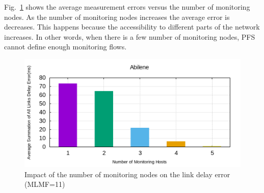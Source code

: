 \documentclass[10pt, journal, letterpaper]{IEEEtran}
\begin{document}
Fig.~\ref{fig:eval_Abilene_summation_of_all_links_delay_error_ms_bar_chart} shows the average measurement errors versus the number of monitoring nodes. As the number of monitoring nodes increases the average error is decreases. This happens because the accessibility to different parts of the network increases. In other words, when there is a few number of monitoring nodes, PFS cannot define enough monitoring flows. 
\begin{figure}
    \centering
    \includegraphics[width=.9\columnwidth]{img/eval_Abilene_summation_of_all_links_delay_error_ms_bar_chart.png}
    \caption{Impact of the number of monitoring nodes on the link delay error (MLMF=11)}
    \label{fig:eval_Abilene_summation_of_all_links_delay_error_ms_bar_chart}
\end{figure}
\end{document}

